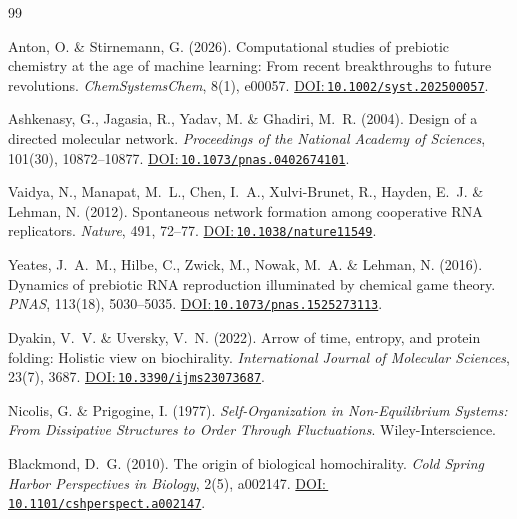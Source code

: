 \documentclass[12pt,a4paper]{article}
\newcommand{\doilink}[1]{\href{https://doi.org/#1}{DOI:\,\nolinkurl{#1}}}
\theoremstyle{remark}
\begin{document}


\begingroup
\small
\setlength{\itemsep}{0.2ex}
\setlength{\parskip}{0pt}
\sloppy
\begin{thebibliography}{99}

Anton, O. \& Stirnemann, G. (2026).
\newblock Computational studies of prebiotic chemistry at the age of machine learning: From recent breakthroughs to future revolutions.
\newblock \textit{ChemSystemsChem}, 8(1), e00057.
\newblock \doilink{10.1002/syst.202500057}.

Ashkenasy, G., Jagasia, R., Yadav, M. \& Ghadiri, M.~R. (2004).
\newblock Design of a directed molecular network.
\newblock \textit{Proceedings of the National Academy of Sciences}, 101(30), 10872--10877.
\newblock \doilink{10.1073/pnas.0402674101}.

Vaidya, N., Manapat, M.~L., Chen, I.~A., Xulvi-Brunet, R., Hayden, E.~J. \& Lehman, N. (2012).
\newblock Spontaneous network formation among cooperative RNA replicators.
\newblock \textit{Nature}, 491, 72--77.
\newblock \doilink{10.1038/nature11549}.

Yeates, J.~A.~M., Hilbe, C., Zwick, M., Nowak, M.~A. \& Lehman, N. (2016).
\newblock Dynamics of prebiotic RNA reproduction illuminated by chemical game theory.
\newblock \textit{PNAS}, 113(18), 5030--5035.
\newblock \doilink{10.1073/pnas.1525273113}.

Dyakin, V.~V. \& Uversky, V.~N. (2022).
\newblock Arrow of time, entropy, and protein folding: Holistic view on biochirality.
\newblock \textit{International Journal of Molecular Sciences}, 23(7), 3687.
\newblock \doilink{10.3390/ijms23073687}.

Nicolis, G. \& Prigogine, I. (1977).
\newblock \textit{Self-Organization in Non-Equilibrium Systems: From Dissipative Structures to Order Through Fluctuations}.
\newblock Wiley-Interscience.

Blackmond, D.~G. (2010).
\newblock The origin of biological homochirality.
\newblock \textit{Cold Spring Harbor Perspectives in Biology}, 2(5), a002147.
\newblock \doilink{10.1101/cshperspect.a002147}.


\end{thebibliography}
\end{document}
